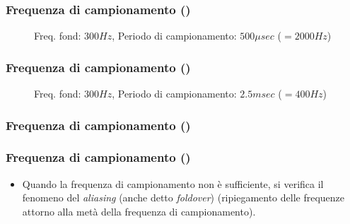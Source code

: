 \begin{frame}
    \frametitle{Frequenza di campionamento ()}

		\begin{center}
    \begin{figure}
      \caption{\scriptsize Freq. fond: $300 Hz$, Periodo di campionamento: $500 {\mu}sec$ ($= 2000 Hz$)}
    \end{figure}
		\end{center}

\end{frame}


\begin{frame}
    \frametitle{Frequenza di campionamento ()}

		\begin{center}
    \begin{figure}
      \caption{\scriptsize Freq. fond: $300 Hz$, Periodo di campionamento: $2.5 msec$ ($= 400 Hz$)}
    \end{figure}
		\end{center}

\end{frame}



\begin{frame}
    \frametitle{Frequenza di campionamento ()}

		\begin{center}
		\end{center}

\end{frame}


\begin{frame}
    \frametitle{Frequenza di campionamento ()}

	\begin{itemize}

		\item Quando la frequenza di campionamento non \`e sufficiente,
              si verifica il fenomeno del \emph{aliasing} (anche detto \emph{foldover})
			  (ripiegamento delle frequenze attorno alla met\`a
			  della frequenza di campionamento).

	\end{itemize}

\end{frame}

